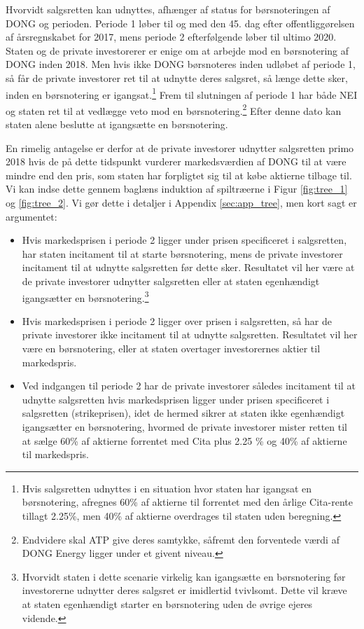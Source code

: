 \documentclass{article}
\begin{document}
Hvorvidt salgsretten kan udnyttes, afhænger af status for børsnoteringen af DONG og perioden. Periode 1 løber til og med den 45. dag efter offentliggørelsen af årsregnskabet for 2017, mens periode 2 efterfølgende løber til ultimo 2020. Staten og de private investorerer er enige om at arbejde mod en børsnotering af DONG inden 2018. Men hvis ikke DONG børsnoteres inden udløbet af periode 1, så får de private investorer ret til at udnytte deres salgsret, så længe dette sker, inden en børsnotering er igangsat.\footnote{Hvis salgsretten udnyttes i en situation hvor staten har igangsat en børsnotering, afregnes 60\% af aktierne til  forrentet med den årlige Cita-rente tillagt 2.25\%, men 40\% af aktierne overdrages til staten uden beregning.} Frem til slutningen af periode 1 har både NEI og staten ret til at vedlægge veto mod en børsnotering.\footnote{Endvidere skal ATP give deres samtykke, såfremt den forventede værdi af DONG Energy ligger under et givent niveau.} Efter denne dato kan staten alene beslutte at igangsætte en børsnotering.

En rimelig antagelse er derfor at de private investorer udnytter salgsretten primo 2018 hvis de på dette tidspunkt vurderer markedsværdien af DONG til at være mindre end den pris, som staten har forpligtet sig til at købe aktierne tilbage til. Vi kan indse dette gennem baglæns induktion af spiltræerne i Figur \ref{fig:tree_1} og \ref{fig:tree_2}. Vi gør dette i detaljer i Appendix \ref{sec:app_tree}, men kort sagt er argumentet:

\begin{itemize}
	\item Hvis markedsprisen i periode 2 ligger under prisen specificeret i salgsretten, har staten incitament til at starte børsnotering, mens de private investorer incitament til at udnytte salgsretten før dette sker. Resultatet vil her være at de private investorer udnytter salgsretten eller at staten egenhændigt igangsætter en børsnotering.\footnote{Hvorvidt staten i dette scenarie virkelig kan igangsætte en børsnotering før investorerne udnytter deres salgsret er imidlertid tvivlsomt. Dette vil kræve at staten egenhændigt starter en børsnotering uden de øvrige ejeres vidende.}
	\item Hvis markedsprisen i periode 2 ligger over prisen i salgsretten, så har de private investorer ikke incitament til at udnytte salgsretten. Resultatet vil her være en børsnotering, eller at staten overtager investorernes aktier til markedspris.
	\item Ved indgangen til periode 2 har de private investorer således incitament til at udnytte salgsretten hvis markedsprisen ligger under prisen specificeret i salgsretten (strikeprisen), idet de hermed sikrer at staten ikke egenhændigt igangsætter en børsnotering, hvormed de private investorer mister retten til at sælge 60\% af aktierne forrentet med Cita plus 2.25 \% og 40\% af aktierne til markedspris.
\end{itemize} 
\end{document}
